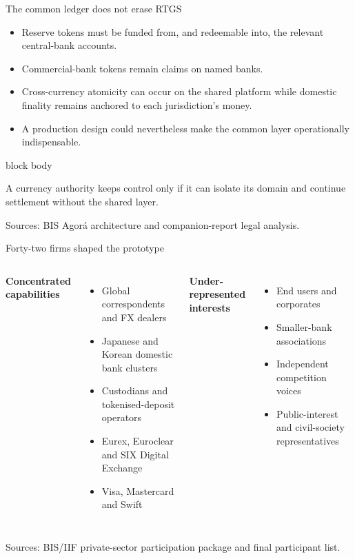 \documentclass[aspectratio=169,12pt]{beamer}
\newcommand{\rust}[1]{\textcolor{Rust}{\textbf{#1}}}
\newcommand{\blue}[1]{\textcolor{Ocean}{\textbf{#1}}}
\newcommand{\source}[1]{\vfill\par\fontsize{5.4}{6.5}\selectfont\color{Quiet}Sources: #1}
\newcommand{\tightitems}{\setlength{\itemsep}{0.42em}\setlength{\parskip}{0pt}}
\newenvironment{statement}{%
  \begin{beamercolorbox}[sep=.18cm,rounded=false,wd=\linewidth]{block body}%
  \fontsize{13}{15.5}\selectfont\bfseries
}{\end{beamercolorbox}}
\begin{document}
\begin{frame}{The common ledger does not erase RTGS}
  \begin{itemize}\tightitems
    \item Reserve tokens must be funded from, and redeemable into, the relevant central-bank accounts.
    \item Commercial-bank tokens remain claims on named banks.
    \item Cross-currency atomicity can occur on the shared platform while domestic finality remains anchored to each jurisdiction's money.
    \item A production design could nevertheless make the common layer operationally indispensable.
  \end{itemize}
  \begin{statement}
    A currency authority keeps control only if it can isolate its domain and continue settlement without the shared layer.
  \end{statement}
  \source{BIS Agor\'a architecture and companion-report legal analysis.}
\end{frame}

\begin{frame}{Forty-two firms shaped the prototype}
  \begin{columns}[T,onlytextwidth]
      \rust{Concentrated capabilities}
      \begin{itemize}\tightitems
        \item Global correspondents and FX dealers
        \item Japanese and Korean domestic bank clusters
        \item Custodians and tokenised-deposit operators
        \item Eurex, Euroclear and SIX Digital Exchange
        \item Visa, Mastercard and Swift
      \end{itemize}
      \blue{Under-represented interests}
      \begin{itemize}\tightitems
        \item End users and corporates
        \item Smaller-bank associations
        \item Independent competition voices
        \item Public-interest and civil-society representatives
      \end{itemize}
  \end{columns}
  \source{BIS/IIF private-sector participation package and final participant list.}
\end{frame}
\end{document}
